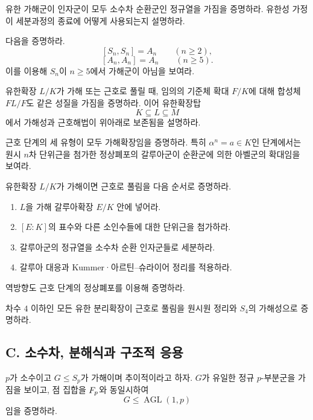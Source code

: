 \begin{exercise}[*]
유한 가해군이 인자군이 모두 소수차 순환군인 정규열을 가짐을 증명하라. 유한성 가정이 세분과정의 종료에 어떻게 사용되는지 설명하라.
\end{exercise}

\begin{exercise}
다음을 증명하라.
\[
  [S_n,S_n]=A_n\qquad(n\ge2),
\]
\[
  [A_n,A_n]=A_n\qquad(n\ge5).
\]
이를 이용해 $S_n$이 $n\ge5$에서 가해군이 아님을 보여라.
\end{exercise}

\begin{exercise}[*]
유한확장 $L/K$가 가해 또는 근호로 풀릴 때, 임의의 기준체 확대 $F/K$에 대해 합성체 $FL/F$도 같은 성질을 가짐을 증명하라. 이어 유한확장탑
\[
  K\subseteq L\subseteq M
\]
에서 가해성과 근호해법이 위아래로 보존됨을 설명하라.
\end{exercise}

\begin{exercise}
근호 단계의 세 유형이 모두 가해확장임을 증명하라. 특히 $\alpha^n=a\in K$인 단계에서는 원시 $n$차 단위근을 첨가한 정상폐포의 갈루아군이 순환군에 의한 아벨군의 확대임을 보여라.
\end{exercise}

\begin{exercise}[*]
유한확장 $L/K$가 가해이면 근호로 풀림을 다음 순서로 증명하라.
\begin{enumerate}[label=(\alph*)]
  \item $L$을 가해 갈루아확장 $E/K$ 안에 넣어라.
  \item $[E:K]$의 표수와 다른 소인수들에 대한 단위근을 첨가하라.
  \item 갈루아군의 정규열을 소수차 순환 인자군들로 세분하라.
  \item 갈루아 대응과 Kummer·아르틴--슈라이어 정리를 적용하라.
\end{enumerate}
역방향도 근호 단계의 정상폐포를 이용해 증명하라.
\end{exercise}

\begin{exercise}
차수 $4$ 이하인 모든 유한 분리확장이 근호로 풀림을 원시원 정리와 $S_4$의 가해성으로 증명하라.
\end{exercise}

\subsection*{C. 소수차, 분해식과 구조적 응용}

\begin{exercise}[*]
$p$가 소수이고 $G\le S_p$가 가해이며 추이적이라고 하자. $G$가 유일한 정규 $p$-부분군을 가짐을 보이고, 점 집합을 $F_p$와 동일시하여
\[
  G\le\operatorname{AGL}(1,p)
\]
임을 증명하라.
\end{exercise}

